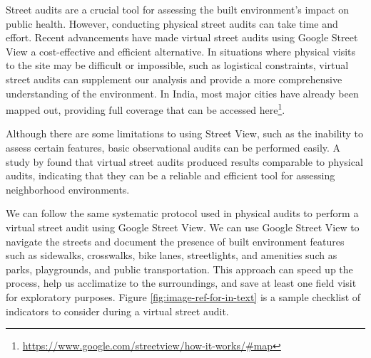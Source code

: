 \documentclass[
]{latex/krantz}
\renewcommand{\href}[2]{#2\footnote{\url{#1}}}
\DeclareRobustCommand{\href}[2]{#2\footnote{\url{#1}}}
\begin{document}
Street audits are a crucial tool for assessing the built environment's impact on public health. However, conducting physical street audits can take time and effort. Recent advancements have made virtual street audits using Google Street View a cost-effective and efficient alternative. In situations where physical visits to the site may be difficult or impossible, such as logistical constraints, virtual street audits can supplement our analysis and provide a more comprehensive understanding of the environment. In India, most major cities have already been mapped out, providing full coverage that can be accessed \href{https://www.google.com/streetview/how-it-works/\#map}{here}.

Although there are some limitations to using Street View, such as the inability to assess certain features, basic observational audits can be performed easily. A study by \autocite{rundle2011} found that virtual street audits produced results comparable to physical audits, indicating that they can be a reliable and efficient tool for assessing neighborhood environments.

We can follow the same systematic protocol used in physical audits to perform a virtual street audit using Google Street View. We can use Google Street View to navigate the streets and document the presence of built environment features such as sidewalks, crosswalks, bike lanes, streetlights, and amenities such as parks, playgrounds, and public transportation. This approach can speed up the process, help us acclimatize to the surroundings, and save at least one field visit for exploratory purposes. Figure \ref{fig:image-ref-for-in-text} is a sample checklist of indicators to consider during a virtual street audit.
\end{document}
